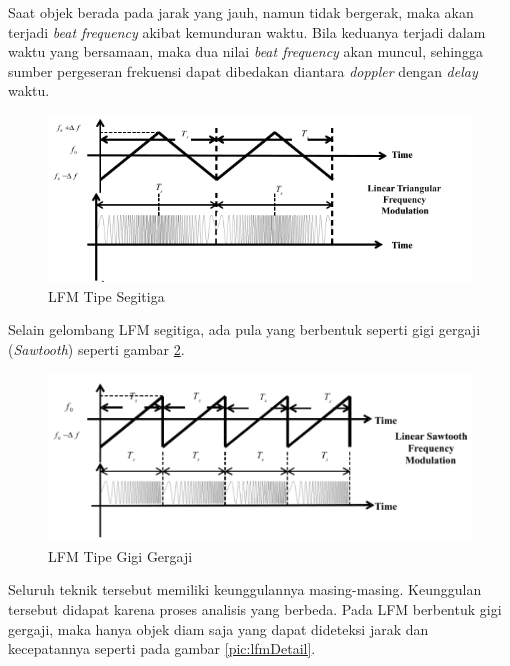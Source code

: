 Saat objek berada pada jarak yang jauh, namun tidak bergerak, maka akan terjadi \textit{beat frequency} akibat kemunduran waktu. Bila keduanya terjadi dalam waktu yang bersamaan, maka dua nilai \textit{beat frequency} akan muncul, sehingga sumber pergeseran frekuensi dapat dibedakan diantara \textit{doppler} dengan \textit{delay} waktu.

\begin{figure}
	\begin{center}
		\includegraphics[scale=0.55]{pics/bab2/lfmTriangular.png}
		\caption[LFM Tipe Segitiga]{LFM Tipe Segitiga \cite{Jankiraman2018}}
		\label{pic:LFMTriangular}
	\end{center}
\end{figure}


Selain gelombang LFM segitiga, ada pula yang berbentuk seperti gigi gergaji (\textit{Sawtooth}) seperti gambar \ref{pic:lfmSaw}.

\begin{figure}
	\begin{center}
		\includegraphics[scale=0.65]{pics/bab2/lfmSawtooth.png}
		\caption[LFM Tipe Gigi Gergaji]{LFM Tipe Gigi Gergaji \cite{Jankiraman2018}}
		\label{pic:lfmSaw}
	\end{center}
\end{figure}

Seluruh teknik tersebut memiliki keunggulannya masing-masing. Keunggulan tersebut didapat karena proses analisis yang berbeda. Pada LFM berbentuk gigi gergaji, maka hanya objek diam saja yang dapat dideteksi jarak dan kecepatannya seperti pada gambar \ref{pic:lfmDetail}.

